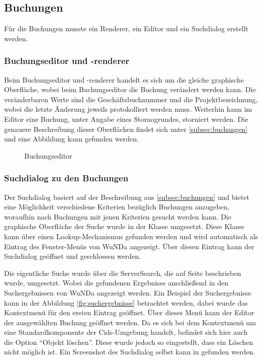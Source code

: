 
\subsection{Buchungen}
Für die Buchungen musste ein Renderer, ein Editor und ein Suchdialog erstellt werden.

\subsubsection{Buchungseditor und -renderer}
Beim Buchungseditor und -renderer handelt es sich um die gleiche graphische Oberfläche, wobei beim Buchungseditor die Buchung verändert werden kann.
Die veränderbaren Werte sind die Geschäftsbuchnummer und die Projektbezeichnung, wobei die letzte Änderung jeweils protokolliert werden muss.
Weiterhin kann im Editor eine Buchung, unter Angabe eines Stornogrundes, storniert werden.
Die genauere Beschreibung dieser Oberflächen findet sich unter \autoref{subsec:buchungen} und eine Abbildung kann  gefunden werden.

\begin{figure}[htbp]
	\centering
	\caption{Buchungseditor}
	\label{fig:buchungseditor}
\end{figure}

\subsubsection{Suchdialog zu den Buchungen}
Der Suchdialog basiert auf der Beschreibung aus \autoref{subsec:buchungen} und bietet eine Möglichkeit verschiedene Kriterien bezüglich Buchungen anzugeben, woraufhin nach Buchungen mit jenen Kriterien gesucht werden kann.
Die graphische Oberfläche der Suche wurde in der Klasse  umgesetzt.
Diese Klasse kann über einen Lookup-Mechanismus gefunden werden und wird automatisch als Eintrag des Fenster-Menüs von \ac{WuNDa} angezeigt.
Über diesen Eintrag kann der Suchdialog geöffnet und geschlossen werden.

Die eigentliche Suche wurde über die ServerSearch, die auf Seite \pageref{subsec:serversearch} beschrieben wurde, umgesetzt.
Wobei die gefundenen Ergebnisse  anschließend in den Suchergebnissen von \ac{WuNDa} angezeigt werden.
Ein Beispiel der Suchergebnisse kann in der Abbildung \vref{fig:suchergebnisse} betrachtet werden, dabei wurde das Kontextmenü für den ersten Eintrag geöffnet.
Über dieses Menü kann der Editor der ausgewählten Buchung geöffnet werden.
Da es sich bei dem Kontextmenü um eine Standardkomponente der Cids-Umgebung handelt, befindet sich hier auch die Option "`Objekt löschen"'.
Diese wurde jedoch so eingestellt, dass ein Löschen nicht möglich ist.
Ein Screenshot des Suchdialog selbst kann in  gefunden werden.

